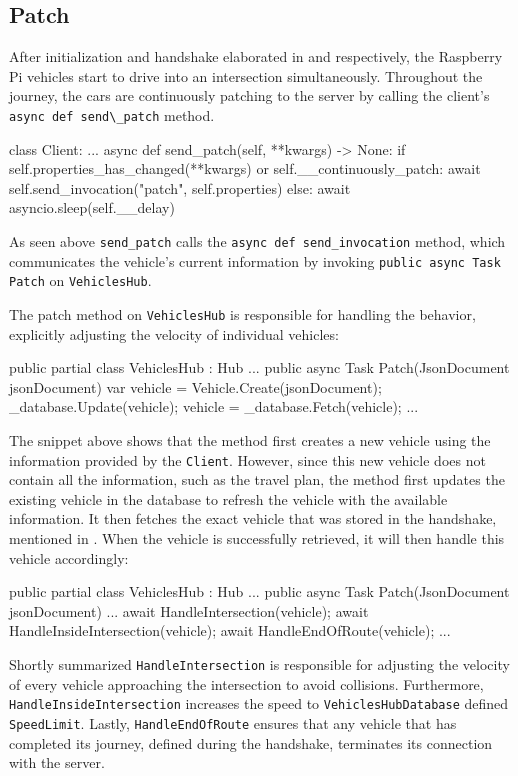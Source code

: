 \subsection{Patch}
After initialization and handshake elaborated in  and  respectively, the Raspberry Pi vehicles start to drive into an intersection simultaneously. Throughout the journey, the cars are continuously patching to the server by calling the client's \verb|async def send\_patch| method.

\begin{python}
class Client:
	...
	async def send_patch(self, **kwargs) -> None:
		if self.properties_has_changed(**kwargs) or self.__continuously_patch:
			await self.send_invocation("patch", self.properties)
		else:
			await asyncio.sleep(self.__delay)
\end{python}

As seen above \verb|send_patch| calls the \verb|async def send_invocation| method, which communicates the vehicle's current information by invoking \newline
\verb|public async Task Patch| on \verb|VehiclesHub|.

The patch method on \verb|VehiclesHub| is responsible for handling the behavior, explicitly adjusting the velocity of individual vehicles:
\begin{csharp}
public partial class VehiclesHub : Hub
{
	...
	public async Task Patch(JsonDocument jsonDocument)
	{
		var vehicle = Vehicle.Create(jsonDocument);
		_database.Update(vehicle);
		vehicle = _database.Fetch(vehicle);
		...
	}
}
\end{csharp}
The snippet above shows that the method first creates a new vehicle using the information provided by the \verb|Client|. However, since this new vehicle does not contain all the information, such as the travel plan, the method first updates the existing vehicle in the database to refresh the vehicle with the available information. It then fetches the exact vehicle that was stored in the handshake, mentioned in . When the vehicle is successfully retrieved, it will then handle this vehicle accordingly:
\begin{csharp}
public partial class VehiclesHub : Hub
{
	...
	public async Task Patch(JsonDocument jsonDocument)
	{
		...
		await HandleIntersection(vehicle);
		await HandleInsideIntersection(vehicle);
		await HandleEndOfRoute(vehicle);
		...
	}
}
\end{csharp}
Shortly summarized \verb|HandleIntersection| is responsible for adjusting the velocity of every vehicle approaching the intersection to avoid collisions. Furthermore, \verb|HandleInsideIntersection| increases the speed to \verb|VehiclesHubDatabase| defined \verb|SpeedLimit|. Lastly, \verb|HandleEndOfRoute| ensures that any vehicle that has completed its journey, defined during the handshake, terminates its connection with the server.